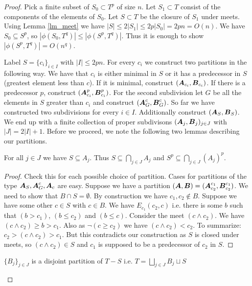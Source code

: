 \documentclass{amsart}
\DeclareMathOperator{\AT}{\boldface A}
\DeclareMathOperator{\BT}{\boldface B}
\begin{document}
\begin{proof}
  Pick a finite subset of $S_0 \subset T^p$ of size $n$. Let $S_1 \subset T$ consist of the components of the elements of $S_0$. Let $S \subset T$ be the closure of $S_1$ under meets. Using Lemma \ref{lm_meet} we have $|S| \leq 2|S_1| \leq 2p|S_0| = 2pn = O(n)$. We have $S_0 \subseteq S^p$, so $|\phi(S_0, T^q)| \leq |\phi(S^p, T^q)|$. Thus it is enough to show $|\phi(S^p, T^q)| = O(n^q)$.
  
  Label $S = \{c_i\}_{i \in I}$ with $|I| \leq 2pn$. For every $c_i$ we construct two partitions in the following way. We have that $c_i$ is either minimal in $S$ or it has a predecessor in $S$ (greatest element less than $c$). If it is minimal, construct $(\AT_{c_i}, \BT_{c_i})$. If there is a predecessor $p$, construct $(\AT^p_{c_i}, \BT^p_{c_i})$. For the second subdivision let $G$ be all the elements in $S$ greater than $c_i$ and construct $(\AT^c_G, \BT^c_G)$. So far we have constructed two subdivisions for every $i \in I$. Additionally construct $(\AT_S, \BT_S)$. We end up with a finite collection of proper subdivisons $(\AT_j, \BT_j)_{j \in J}$ with $|J| = 2|I| + 1$. Before we proceed, we note the following two lemmas describing our partitions.
  
  \begin{Lemma}
    For all $j \in J$ we have $S \subseteq A_j$. Thus $S \subseteq \bigcap_{j \in J} A_j$ and $S^p \subseteq \bigcap_{j \in J} (A_j)^p$. 
  \end{Lemma}
  
  \begin{proof}
    Check this for each possible choice of partition. Cases for partitions of the type $\AT_S, \AT^c_G, \AT_c$ are easy. Suppose we have a partition $(\AT, \BT) = (\AT^{c_1}_{c_2}, \BT^{c_1}_{c_2})$. We need to show that $B \cap S = \emptyset$. By construction we have $c_1, c_2 \notin B$. Suppose we have some other $c \in S$ with $c \in B$. We have $E_{c_1}(c_2, c)$ i.e. there is some $b$ such that $(b > c_1)$, $(b \leq c_2)$ and $(b \leq c)$. Consider the meet $(c \wedge c_2)$. We have $(c \wedge c_2) \geq b > c_1$. Also as $\neg (c \geq c_2)$ we have $(c \wedge c_2) < c_2$. To summarize: $c_2 > (c \wedge c_2) > c_1$. But this contradicts our construction as $S$ is closed under meets, so $(c \wedge c_2) \in S$ and $c_1$ is supposed to be a predecessor of $c_2$ in $S$.
  \end{proof}
  
  \begin{Lemma}
    $\{B_j\}_{j \in J}$ is a disjoint partition of $T - S$ i.e. $T = \bigsqcup_{j \in J} B_j \sqcup S$
  \end{Lemma}
  

\end{proof}
\end{document}
